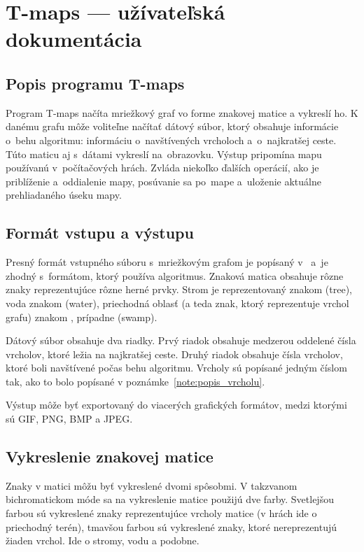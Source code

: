 \chapter{T-maps --- užívateľská dokumentácia}
\label{userdoc}
\section{Popis programu T-maps}
Program T-maps načíta mriežkový graf vo forme znakovej matice a vykreslí ho. K danému grafu môže voliteľne načítať dátový súbor, ktorý obsahuje
informácie o~behu algoritmu: informáciu o~navštívených vrcholoch a~o~najkratšej ceste.
Túto maticu aj s~dátami vykreslí na~obrazovku. Výstup pripomína mapu používanú v~počítačových hrách.
Zvláda niekoľko ďalších operácií, ako je priblíženie a~oddialenie mapy, posúvanie sa po~mape a~uloženie aktuálne prehliadaného úseku mapy.


\section{Formát vstupu a výstupu}
Presný formát vstupného súboru s~mriežkovým grafom je popísaný v~\cite{sturtevant2012benchmarks} a~je zhodný s~formátom, 
ktorý používa algoritmus. Znaková matica obsahuje rôzne znaky reprezentujúce rôzne herné prvky.
Strom je reprezentovaný znakom  (tree), voda znakom  (water), priechodná oblasť (a teda znak, ktorý reprezentuje
vrchol grafu) znakom , prípadne  (swamp).

Dátový súbor obsahuje dva riadky. Prvý riadok obsahuje medzerou oddelené čísla vrcholov, ktoré ležia na najkratšej ceste.
Druhý riadok obsahuje čísla vrcholov, ktoré boli navštívené počas behu algoritmu. 
Vrcholy sú popísané jedným číslom tak, ako to bolo popísané v poznámke~\ref{note:popis_vrcholu}.

Výstup môže byť exportovaný do viacerých grafických formátov, medzi ktorými sú GIF, PNG, BMP a JPEG.



\section{Vykreslenie znakovej matice}

Znaky v matici môžu byť vykreslené dvomi spôsobmi. V takzvanom bichromatickom móde sa na vykreslenie matice použijú dve farby.
Svetlejšou farbou sú vykreslené znaky reprezentujúce vrcholy matice (v hrách ide o priechodný terén), tmavšou farbou sú vykreslené znaky, ktoré
nereprezentujú žiaden vrchol. Ide o stromy, vodu a podobne.

